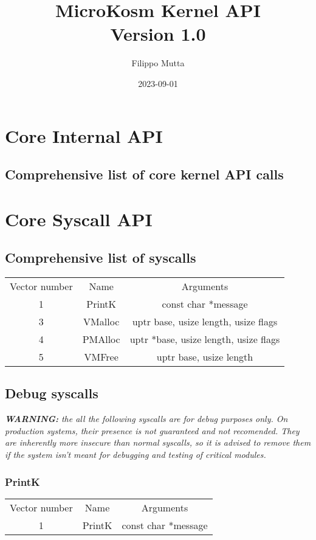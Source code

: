\documentclass{report}
\title{%
  \large MicroKosm Kernel API \\
   Version 1.0 \\
   }
\date{2023-09-01}
\author{Filippo Mutta}
\begin{document}
\maketitle
\newpage


\tableofcontents

\chapter{Core Internal API}
\section{Comprehensive list of core kernel API calls}

\chapter{Core Syscall API}
\section{Comprehensive list of syscalls}

\begin{tabular}{ |c|c|c| }
	Vector number & Name & Arguments \\ 
	1 & PrintK & const char *message \\
	3 & VMalloc & uptr base, usize length, usize flags \\
	4 & PMAlloc & uptr *base, usize length, usize flags \\
	5 & VMFree & uptr base, usize length \\
\end{tabular}

\section{Debug syscalls}

\textit{\textbf{WARNING:} the all the following syscalls are for debug purposes only. On production systems, their presence is not guaranteed and not recomended. They are inherently more insecure than normal syscalls, so it is advised to remove them if the system isn't meant for debugging and testing of critical modules.}

\subsection{PrintK}
\begin{tabular}{ |c|c|c| }
	Vector number & Name & Arguments \\ 
	1 & PrintK & const char *message \\
\end{tabular}
\end{document}
